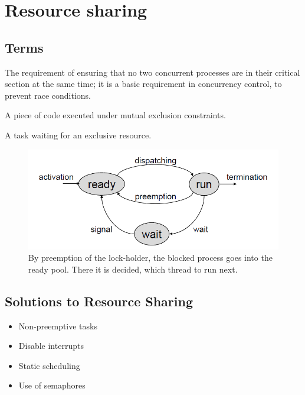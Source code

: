 
\section{Resource sharing}

\subsection{Terms}
\begin{definition}
The requirement of ensuring that no two concurrent processes are in their critical section at the same time; it is a basic requirement in concurrency control, to prevent race conditions.
\end{definition}

\begin{definition}
A piece of code executed under mutual exclusion constraints.
\end{definition}

\begin{definition}[Blocked]
A task waiting for an exclusive resource.
\end{definition}


\begin{figure}[ht]
	\centering
  	\includegraphics[scale=0.3]{img/5_resource_run_cycle.png}
	\caption{By preemption of the lock-holder, the blocked process goes into the ready pool. There it is decided, which thread to run next.}
	\label{fig1}
\end{figure}


\subsection{Solutions to Resource Sharing}

\begin{itemize}[noitemsep]
\item Non-preemptive tasks
\item Disable interrupts
\item Static scheduling
\item Use of semaphores
\end{itemize}




